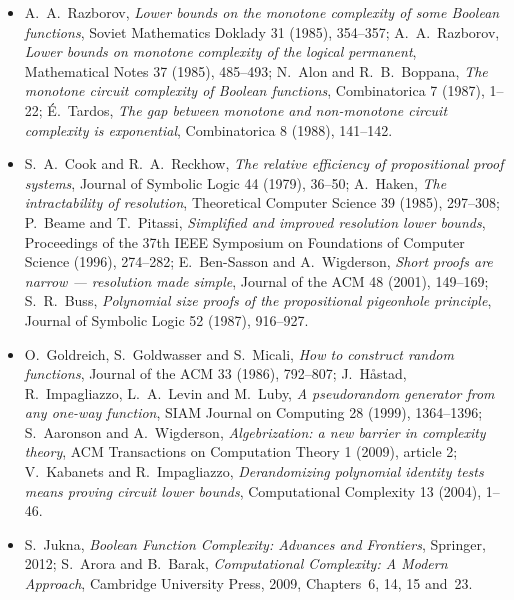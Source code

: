 \begin{itemize}
\item A.~A.~Razborov, \emph{Lower bounds on the monotone complexity of some Boolean functions}, Soviet Mathematics Doklady 31 (1985), 354--357; A.~A.~Razborov, \emph{Lower bounds on monotone complexity of the logical permanent}, Mathematical Notes 37 (1985), 485--493; N.~Alon and R.~B.~Boppana, \emph{The monotone circuit complexity of Boolean functions}, Combinatorica 7 (1987), 1--22; \'E.~Tardos, \emph{The gap between monotone and non-monotone circuit complexity is exponential}, Combinatorica 8 (1988), 141--142.
\item S.~A.~Cook and R.~A.~Reckhow, \emph{The relative efficiency of propositional proof systems}, Journal of Symbolic Logic 44 (1979), 36--50; A.~Haken, \emph{The intractability of resolution}, Theoretical Computer Science 39 (1985), 297--308; P.~Beame and T.~Pitassi, \emph{Simplified and improved resolution lower bounds}, Proceedings of the 37th IEEE Symposium on Foundations of Computer Science (1996), 274--282; E.~Ben-Sasson and A.~Wigderson, \emph{Short proofs are narrow --- resolution made simple}, Journal of the ACM 48 (2001), 149--169; S.~R.~Buss, \emph{Polynomial size proofs of the propositional pigeonhole principle}, Journal of Symbolic Logic 52 (1987), 916--927.
\item O.~Goldreich, S.~Goldwasser and S.~Micali, \emph{How to construct random functions}, Journal of the ACM 33 (1986), 792--807; J.~Håstad, R.~Impagliazzo, L.~A.~Levin and M.~Luby, \emph{A pseudorandom generator from any one-way function}, SIAM Journal on Computing 28 (1999), 1364--1396; S.~Aaronson and A.~Wigderson, \emph{Algebrization: a new barrier in complexity theory}, ACM Transactions on Computation Theory 1 (2009), article 2; V.~Kabanets and R.~Impagliazzo, \emph{Derandomizing polynomial identity tests means proving circuit lower bounds}, Computational Complexity 13 (2004), 1--46.
\item S.~Jukna, \emph{Boolean Function Complexity: Advances and Frontiers}, Springer, 2012; S.~Arora and B.~Barak, \emph{Computational Complexity: A Modern Approach}, Cambridge University Press, 2009, Chapters~6, 14, 15 and~23.
\end{itemize}
